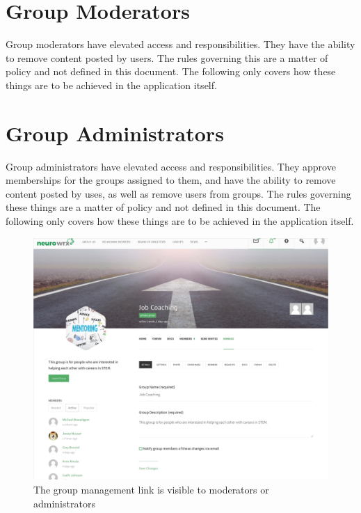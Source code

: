 \documentclass[10pt]{article}
\begin{document}
\section{Group Moderators}
Group moderators have elevated access and responsibilities.  They have the ability to remove content posted by users.  The rules governing this are a matter of policy and not defined in this document.  The following only covers how these things are to be achieved in the application itself. 









\section{Group Administrators}
Group administrators have elevated access and responsibilities.  They approve memberships for the groups assigned to them, and have the ability to remove content posted by uses, as well as remove users from groups.  The rules governing these things are a matter of policy and not defined in this document.  The following only covers how these things are to be achieved in the application itself. 

\begin{figure}[H]
    \centering
    \includegraphics[scale=0.25]{images/groupmanage.jpg}
    \caption{The group management link is visible to moderators or administrators}
    \label{groupmanagelink}
\end{figure}
\end{document}
